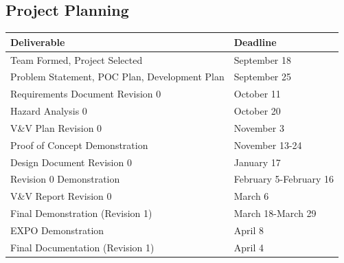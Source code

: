 \documentclass[12pt]{article}
\begin{document}
\subsection{Project Planning}
\begin{table}[H]
    \begin{tabular}{|l|l|}
    \hline
    \textbf{Deliverable}                          & \textbf{Deadline}      \\ \hline
    Team Formed, Project Selected                 & September 18           \\ \hline
    Problem Statement, POC Plan, Development Plan & September 25           \\ \hline
    Requirements Document Revision 0              & October 11             \\ \hline
    Hazard Analysis 0                             & October 20             \\ \hline
    V\&V Plan Revision 0                          & November 3             \\ \hline
    Proof of Concept Demonstration                & November 13-24         \\ \hline
    Design Document Revision 0                    & January 17             \\ \hline
    Revision 0 Demonstration                      & February 5-February 16 \\ \hline
    V\&V Report Revision 0                        & March 6                \\ \hline
    Final Demonstration (Revision 1)              & March 18-March 29      \\ \hline
    EXPO Demonstration                            & April 8             \\ \hline
    Final Documentation (Revision 1)              & April 4                \\ \hline
    \end{tabular}
\end{table}
\end{document}
